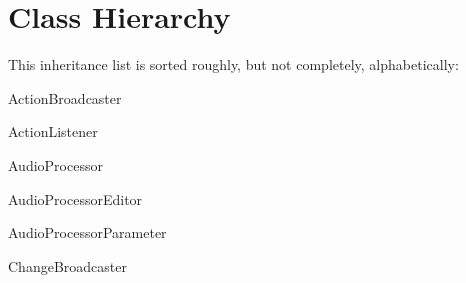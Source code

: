 \section{Class Hierarchy}
This inheritance list is sorted roughly, but not completely, alphabetically\+:\begin{DoxyCompactList}
\item Action\+Broadcaster\begin{DoxyCompactList}
\item {}
\item {}
\end{DoxyCompactList}
\item Action\+Listener\begin{DoxyCompactList}
\item {}
\end{DoxyCompactList}
\item Audio\+Processor\begin{DoxyCompactList}
\item {}
\item {}
\end{DoxyCompactList}
\item Audio\+Processor\+Editor\begin{DoxyCompactList}
\item {}
\end{DoxyCompactList}
\item Audio\+Processor\+Parameter\begin{DoxyCompactList}
\item {}
\end{DoxyCompactList}
\item Change\+Broadcaster\begin{DoxyCompactList}
\item {}
\item {}
\begin{DoxyCompactList}

\end{DoxyCompactList}
\end{DoxyCompactList}
\end{DoxyCompactList}
